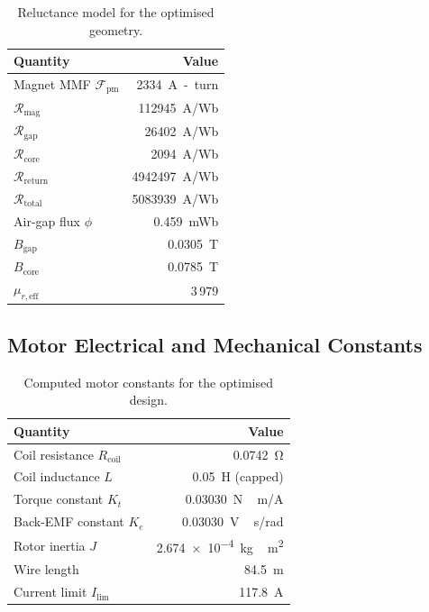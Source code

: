 \documentclass[10pt, twocolumn, a4paper]{article}
\begin{document}
\begin{table}[H]
  \centering
  \caption{Reluctance model for the optimised geometry.}
  \label{tab:mag}
  \small
  \setlength{\tabcolsep}{6pt}
  \begin{tabular}{@{} L{3.2cm} r @{}}
    \toprule
    \textbf{Quantity} & \textbf{Value} \\
    \midrule
    Magnet MMF $\mathcal{F}_\text{pm}$     & \SI{2334}{A-turn} \\
    $\mathcal{R}_\text{mag}$               & \SI{112945}{A/Wb} \\
    $\mathcal{R}_\text{gap}$               & \SI{26402}{A/Wb} \\
    $\mathcal{R}_\text{core}$              & \SI{2094}{A/Wb} \\
    $\mathcal{R}_\text{return}$            & \SI{4942497}{A/Wb} \\
    $\mathcal{R}_\text{total}$             & \SI{5083939}{A/Wb} \\
    Air-gap flux $\phi$                    & \SI{0.459}{mWb} \\
    $B_\text{gap}$                         & \SI{0.0305}{T} \\
    $B_\text{core}$                        & \SI{0.0785}{T} \\
    $\mu_{r,\text{eff}}$                   & 3\,979 \\
    \bottomrule
  \end{tabular}
\end{table}

\subsection{Motor Electrical and Mechanical Constants}

\begin{table}[H]
  \centering
  \caption{Computed motor constants for the optimised design.}
  \label{tab:motorconst}
  \small
  \setlength{\tabcolsep}{6pt}
  \begin{tabular}{@{} L{3.2cm} r @{}}
    \toprule
    \textbf{Quantity} & \textbf{Value} \\
    \midrule
    Coil resistance $R_\text{coil}$  & \SI{0.0742}{\ohm} \\
    Coil inductance $L$              & \SI{0.05}{H} (capped) \\
    Torque constant $K_t$            & \SI{0.03030}{N\,m/A} \\
    Back-EMF constant $K_e$          & \SI{0.03030}{V\,s/rad} \\
    Rotor inertia $J$                & \SI{2.674e-4}{kg\,m^2} \\
    Wire length                      & \SI{84.5}{m} \\
    Current limit $I_\text{lim}$     & \SI{117.8}{A} \\
    \bottomrule
  \end{tabular}
\end{table}
\end{document}
